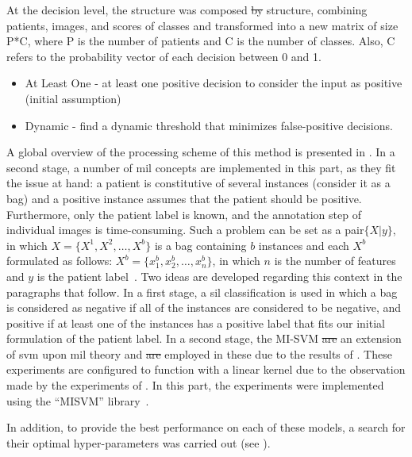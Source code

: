 \documentclass[journal,article,accept,moreauthors,pdftex, applsci]{Definitions/mdpi}
\providecommand{\DIFadd}[1]{{\protect\color{blue}\uwave{#1}}} %
\providecommand{\DIFdel}[1]{{\protect\color{red}\sout{#1}}}                      %
\providecommand{\DIFaddbegin}{} %
\providecommand{\DIFaddend}{} %
\providecommand{\DIFdelbegin}{} %
\providecommand{\DIFdelend}{} %
\begin{document}
At the decision level, the structure was composed \DIFdelbegin \DIFdel{by }\DIFdelend \DIFaddbegin \DIFadd{of }\DIFaddend structure, combining patients, images, and scores of classes and transformed into a new matrix of size P*C, where P is the number of patients and C is the number of classes. Also, C refers to the probability vector of each decision between 0 and 1.
\begin{itemize}
\item At Least One - at least one positive decision to consider the input as positive (initial assumption)
\item Dynamic - find a dynamic threshold that minimizes false-positive decisions.
\end{itemize}
A global overview of the processing scheme of this method is presented in .
In a second stage, a number of \ac{mil} concepts are implemented in this part, as they fit the issue at hand: a patient is constitutive of several instances (consider it as a bag) and a positive instance assumes that the patient should be positive. Furthermore, only the patient label is known, and the annotation step of individual images is time-consuming. Such a problem can be set as a pair\(\{X|y\}\), in which \(X=\{X^1,X^2,\ldots,X^b\}\) is a bag containing \(b\) instances and each \(X^b\) formulated as follows: \(X^b=\{x^b_1,x^b_2,\ldots,x^b_n\}\), in which \(n\) is the number of features and \(y\) is the patient label~\cite{foulds_frank_2010}. Two ideas are developed regarding this context in the paragraphs that follow. In a first stage, a \ac{sil} classification is used in which a bag is considered as negative if all of the instances are considered to be negative, and positive if at least one of the instances has a positive label that fits our initial formulation of the patient label. In a second stage, the MI-SVM \DIFdelbegin \DIFdel{are }\DIFdelend \DIFaddbegin \DIFadd{is }\DIFaddend an extension of \ac{svm} upon \ac{mil} theory and \DIFdelbegin \DIFdel{are }\DIFdelend \DIFaddbegin \DIFadd{is }\DIFaddend employed in these due to the results of . These experiments are configured to function with a linear kernel due to the observation made by the experiments of . In this part, the experiments were implemented using the “MISVM” library~\cite{Doran2014}.\par
In addition, to provide the best performance on each of these models, a search for their optimal hyper-parameters was carried out (see ).\par
\end{document}
